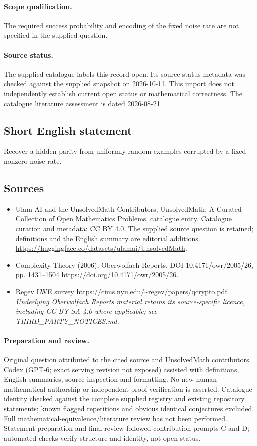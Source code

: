 \documentclass[11pt]{article}
\begin{document}
\paragraph{Scope qualification.}
The required success probability and encoding of the fixed noise rate are not specified in the supplied question.
\paragraph{Source status.}
The supplied catalogue labels this record open. Its source-status metadata was checked against the supplied snapshot on 2026-10-11. This import does not independently establish current open status or mathematical correctness. The catalogue literature assessment is dated 2026-08-21.
\subsection{Short English statement}
Recover a hidden parity from uniformly random examples corrupted by a fixed nonzero noise rate.
\subsection{Sources}
\begin{itemize}
\item[S1] Ulam AI and the UnsolvedMath Contributors, UnsolvedMath: A Curated Collection of Open Mathematics Problems, catalogue entry. Catalogue curation and metadata: CC BY 4.0. The supplied source question is retained; definitions and the English summary are editorial additions.
\url{https://huggingface.co/datasets/ulamai/UnsolvedMath}.
\item[S2] Complexity Theory (2006), Oberwolfach Reports, DOI 10.4171/owr/2005/26, pp. 1431--1504
\url{https://doi.org/10.4171/owr/2005/26}.
\item[S3] Regev LWE survey
\url{https://cims.nyu.edu/~regev/papers/qcrypto.pdf}.
\textit{Underlying Oberwolfach Reports material retains its source-specific licence, including CC BY-SA 4.0 where applicable; see THIRD\_PARTY\_NOTICES.md.}
\end{itemize}
\paragraph{Preparation and review.}
Original question attributed to the cited source and UnsolvedMath contributors. Codex (GPT-6; exact serving revision not exposed) assisted with definitions, English summaries, source inspection and formatting. No new human mathematical authorship or independent proof verification is asserted. Catalogue identity checked against the complete supplied registry and existing repository statements; known flagged repetitions and obvious identical conjectures excluded. Full mathematical-equivalence/literature review has not been performed. Statement preparation and final review followed contribution prompts C and D; automated checks verify structure and identity, not open status.
\label{end:statement}
\end{document}
